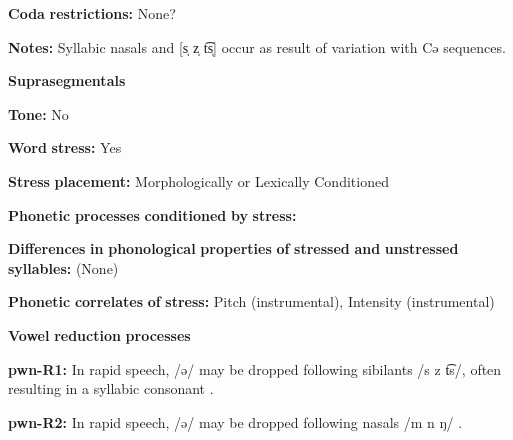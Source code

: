 \documentclass[output=paper]{langsci/langscibook}
\begin{document}
\begin{styleBody}
\textbf{Coda} \textbf{restrictions:} None?
\end{styleBody}

\begin{styleBody}
\textbf{Notes:} Syllabic nasals and [s̩ z̩ t͡s̩] occur as result of variation with Cə sequences.
\end{styleBody}

\begin{styleBody}
\textbf{Suprasegmentals}
\end{styleBody}

\begin{styleBody}
\textbf{Tone:} No
\end{styleBody}

\begin{styleBody}
\textbf{Word} \textbf{stress:} Yes
\end{styleBody}

\begin{styleBody}
\textbf{Stress} \textbf{placement:} Morphologically or Lexically Conditioned
\end{styleBody}

\begin{styleBody}
\textbf{Phonetic} \textbf{processes} \textbf{conditioned} \textbf{by} \textbf{stress:}
\end{styleBody}

\begin{styleBody}
\textbf{Differences} \textbf{in} \textbf{phonological} \textbf{properties} \textbf{of} \textbf{stressed} \textbf{and} \textbf{unstressed} \textbf{syllables:} (None)
\end{styleBody}

\begin{styleBody}
\textbf{Phonetic} \textbf{correlates} \textbf{of} \textbf{stress:} Pitch (instrumental), Intensity (instrumental)
\end{styleBody}

\begin{styleBody}
\textbf{Vowel} \textbf{reduction} \textbf{processes}
\end{styleBody}

\begin{styleBody}
\textbf{pwn-R1:} In rapid speech, /ə/ may be dropped following sibilants /s z t͡s/, often resulting in a syllabic consonant \citep[40-41]{Chang2006}.
\end{styleBody}

\begin{styleBody}
\textbf{pwn-R2:} In rapid speech, /ə/ may be dropped following nasals /m n ŋ/ \citep[41]{Chang2006}.
\end{styleBody}
\end{document}
